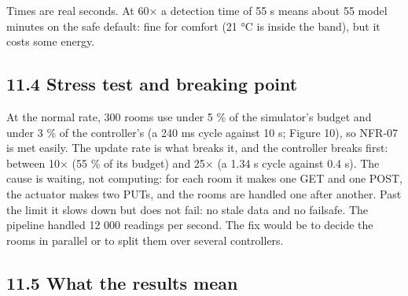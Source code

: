 \documentclass[11pt]{article}
\begin{document}
Times are real seconds. At 60× a detection time of 55 s means about 55 model minutes on the safe
default: fine for comfort (21 °C is inside the band), but it costs some energy.

\subsection{11.4 Stress test and breaking point}


At the normal rate, 300 rooms use under 5 \% of the simulator's budget and under 3 \% of the controller's (a 240 ms cycle against 10 s; Figure 10), so NFR-07 is met easily. The update rate is what
breaks it, and the controller breaks first: between 10× (55 \% of its budget) and 25× (a 1.34 s
cycle against 0.4 s). The cause is waiting, not computing: for each room it makes one GET and one
POST, the actuator makes two PUTs, and the rooms are handled one after another. Past the limit it
slows down but does not fail: no stale data and no failsafe. The pipeline handled 12 000 readings
per second. The fix would be to decide the rooms in parallel or to split them over several
controllers.

\subsection{11.5 What the results mean}
\end{document}
